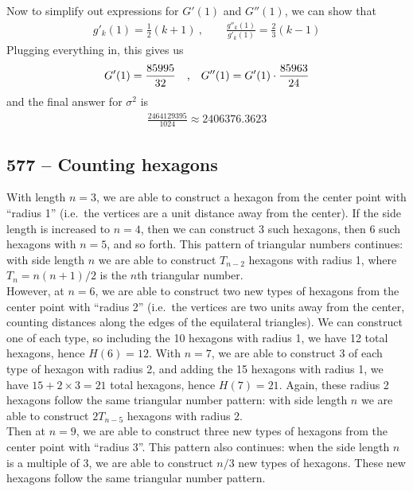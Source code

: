 \documentclass{article}
\begin{document}
Now to simplify out expressions for $G'(1)$ and $G''(1)$, we can show that
\begin{align*}
	g'_k(1) = \frac{1}{2}(k+1) ~, \qquad \frac{g''_k(1)}{g'_k(1)} = \frac{2}{3}(k-1)
\end{align*}
Plugging everything in, this gives us
\begin{align*}
	G'(1) = \frac{85995}{32} \qq{,} G''(1) = G'(1) \cdot \frac{85963}{24}
\end{align*}
and the final answer for $\sigma^2$ is
\begin{align*}
	\frac{2464129395}{1024} \approx \boxed{ 2406376.3623}
\end{align*}


\subsection*{577 -- Counting hexagons}
With length $n=3$, we are able to construct a hexagon from the center point with ``radius 1'' (i.e.~the vertices are a unit distance away from the center).
If the side length is increased to $n=4$, then we can construct 3 such hexagons, then 6 such hexagons with $n=5$, and so forth.
This pattern of triangular numbers continues: with side length $n$ we are able to construct $T_{n-2}$ hexagons with radius 1, where $T_n = n(n+1)/2$ is the $n$th triangular number. \\

However, at $n=6$, we are able to construct two new types of hexagons from the center point with ``radius 2'' (i.e.~the vertices are two units away from the center, counting distances along the edges of the equilateral triangles). 
We can construct one of each type, so including the 10 hexagons with radius 1, we have 12 total hexagons, hence $H(6)=12$.
With $n=7$, we are able to construct 3 of each type of hexagon with radius 2, and adding the 15 hexagons with radius 1, we have $15 + 2\times 3 = 21$ total hexagons, hence $H(7)=21$.
Again, these radius 2 hexagons follow the same triangular number pattern: with side length $n$ we are able to construct $2T_{n-5}$ hexagons with radius 2. \\

Then at $n=9$, we are able to construct three new types of hexagons from the center point with ``radius 3''.
This pattern also continues: when the side length $n$ is a multiple of 3, we are able to construct $n/3$ new types of hexagons.
These new hexagons follow the same triangular number pattern. \\
\end{document}
